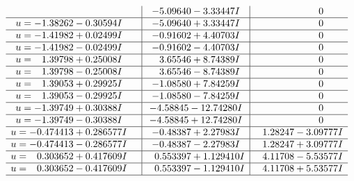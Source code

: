 \documentclass[1p]{elsarticle_modified}
\theoremstyle{definition}
\begin{document}
$$\begin{array}{c|c|c}
 & -5.09640 - 3.33447 I & \phantom{-0.000000 } 0 \\ \hline\begin{aligned}
u &= -1.38262 - 0.30594 I\end{aligned}
 & -5.09640 + 3.33447 I & \phantom{-0.000000 } 0 \\ \hline\begin{aligned}
u &= -1.41982 + 0.02499 I\end{aligned}
 & -0.91602 + 4.40703 I & \phantom{-0.000000 } 0 \\ \hline\begin{aligned}
u &= -1.41982 - 0.02499 I\end{aligned}
 & -0.91602 - 4.40703 I & \phantom{-0.000000 } 0 \\ \hline\begin{aligned}
u &= \phantom{-}1.39798 + 0.25008 I\end{aligned}
 & \phantom{-}3.65546 + 8.74389 I & \phantom{-0.000000 } 0 \\ \hline\begin{aligned}
u &= \phantom{-}1.39798 - 0.25008 I\end{aligned}
 & \phantom{-}3.65546 - 8.74389 I & \phantom{-0.000000 } 0 \\ \hline\begin{aligned}
u &= \phantom{-}1.39053 + 0.29925 I\end{aligned}
 & -1.08580 + 7.84259 I & \phantom{-0.000000 } 0 \\ \hline\begin{aligned}
u &= \phantom{-}1.39053 - 0.29925 I\end{aligned}
 & -1.08580 - 7.84259 I & \phantom{-0.000000 } 0 \\ \hline\begin{aligned}
u &= -1.39749 + 0.30388 I\end{aligned}
 & -4.58845 - 12.74280 I & \phantom{-0.000000 } 0 \\ \hline\begin{aligned}
u &= -1.39749 - 0.30388 I\end{aligned}
 & -4.58845 + 12.74280 I & \phantom{-0.000000 } 0 \\ \hline\begin{aligned}
u &= -0.474413 + 0.286577 I\end{aligned}
 & -0.48387 + 2.27983 I & \phantom{-}1.28247 - 3.09777 I \\ \hline\begin{aligned}
u &= -0.474413 - 0.286577 I\end{aligned}
 & -0.48387 - 2.27983 I & \phantom{-}1.28247 + 3.09777 I \\ \hline\begin{aligned}
u &= \phantom{-}0.303652 + 0.417609 I\end{aligned}
 & \phantom{-}0.553397 + 1.129410 I & \phantom{-}4.11708 - 5.53577 I \\ \hline\begin{aligned}
u &= \phantom{-}0.303652 - 0.417609 I\end{aligned}
 & \phantom{-}0.553397 - 1.129410 I & \phantom{-}4.11708 + 5.53577 I\\
 \hline 
 \end{array}$$\newpage
\end{document}
